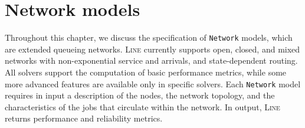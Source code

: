 \chapter{Network models}
\label{Network-models}

Throughout this chapter, we discuss the specification of \texttt{Network} models, which are extended queueing networks. \textsc{Line} currently supports open, closed, and mixed networks with non-exponential service and arrivals, and state-dependent routing. %
All solvers support the computation of basic performance metrics, while some more advanced features are available only in specific solvers. %
Each \texttt{Network} model requires in input a description of the nodes, the network topology, and the characteristics of the jobs that circulate within the network. In output, \textsc{Line} returns performance and reliability metrics.

